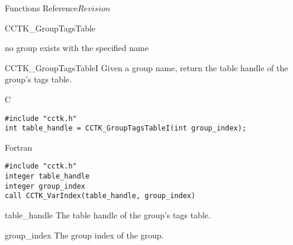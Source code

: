 \begin{cactuspart}{ Functions Reference}{}{$Revision$}
\begin{FunctionDescription}{CCTK\_GroupTagsTable}
\begin{ErrorSection}
\begin{Error}{-1}
no group exists with the specified name
\end{Error}
\end{ErrorSection}
\end{FunctionDescription}




\begin{FunctionDescription}{CCTK\_GroupTagsTableI}
\label{CCTK-GroupTagsTableI}
Given a group name, return the table handle of the group's tags table.

\begin{SynopsisSection}
\begin{Synopsis}{C}
\begin{verbatim}
#include "cctk.h"
int table_handle = CCTK_GroupTagsTableI(int group_index);
\end{verbatim}
\end{Synopsis}
\begin{Synopsis}{Fortran}
\begin{verbatim}
#include "cctk.h"
integer table_handle
integer group_index
call CCTK_VarIndex(table_handle, group_index)
\end{verbatim}
\end{Synopsis}
\end{SynopsisSection}

\begin{ResultSection}
\begin{Result}{table\_handle}
The table handle of the group's tags table.
\end{Result}
\end{ResultSection}

\begin{ParameterSection}
\begin{Parameter}{group\_index}
The group index of the group.
\end{Parameter}
\end{ParameterSection}


\end{FunctionDescription}
\end{cactuspart}
